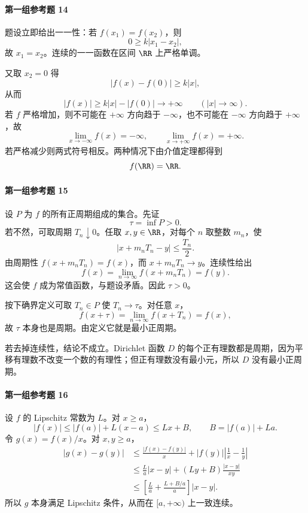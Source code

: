 \paragraph{第一组参考题 14}
\begin{xsolution}
题设立即给出一一性：若 $f(x_1)=f(x_2)$，则
\[
 0\ge k|x_1-x_2|,
\]
故 $x_1=x_2$。连续的一一函数在区间 $\RR$ 上严格单调。

又取 $x_2=0$ 得
\[
 |f(x)-f(0)|\ge k|x|,
\]
从而
\[
 |f(x)|\ge k|x|-|f(0)|\to+\infty
 \qquad(|x|\to\infty).
\]
若 $f$ 严格增加，则不可能在 $+\infty$ 方向趋于 $-\infty$，也不可能在 $-\infty$ 方向趋于 $+\infty$，故
\[
 \lim_{x\to-\infty}f(x)=-\infty,
 \qquad
 \lim_{x\to+\infty}f(x)=+\infty.
\]
若严格减少则两式符号相反。两种情况下由介值定理都得到
\[
 f(\RR)=\RR.
\]
\end{xsolution}

\paragraph{第一组参考题 15}
\begin{xsolution}
设 $P$ 为 $f$ 的所有正周期组成的集合。先证
\[
 \tau=\inf P>0.
\]
若不然，可取周期 $T_n\downarrow0$。任取 $x,y\in\RR$，对每个 $n$ 取整数 $m_n$，使
\[
 |x+m_nT_n-y|\le\frac{T_n}{2}.
\]
由周期性 $f(x+m_nT_n)=f(x)$，而 $x+m_nT_n\to y$。连续性给出
\[
 f(x)=\lim_{n\to\infty}f(x+m_nT_n)=f(y).
\]
这会使 $f$ 成为常值函数，与题设矛盾。因此 $\tau>0$。

按下确界定义可取 $T_n\in P$ 使 $T_n\to\tau$。对任意 $x$，
\[
 f(x+\tau)
 =\lim_{n\to\infty}f(x+T_n)
 =f(x),
\]
故 $\tau$ 本身也是周期。由定义它就是最小正周期。

若去掉连续性，结论不成立。Dirichlet 函数 $D$ 的每个正有理数都是周期，因为平移有理数不改变一个数的有理性；但正有理数没有最小元，所以 $D$ 没有最小正周期。
\end{xsolution}

\paragraph{第一组参考题 16}
\begin{xsolution}
设 $f$ 的 Lipschitz 常数为 $L$。对 $x\ge a$，
\[
 |f(x)|\le |f(a)|+L(x-a)\le Lx+B,
 \qquad B=|f(a)|+La.
\]
令 $g(x)=f(x)/x$。对 $x,y\ge a$，
\[
 \begin{aligned}
 |g(x)-g(y)|
 &\le\frac{|f(x)-f(y)|}{x}
 +|f(y)|\left|\frac1x-\frac1y\right|\\
 &\le\frac{L}{a}|x-y|
 +(Ly+B)\frac{|x-y|}{xy}\\
 &\le\left[\frac{L}{a}+\frac{L+B/a}{a}\right]|x-y|.
 \end{aligned}
\]
所以 $g$ 本身满足 Lipschitz 条件，从而在 $[a,+\infty)$ 上一致连续。
\end{xsolution}

